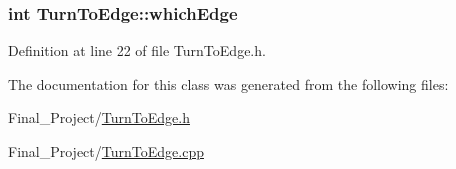\hypertarget{classTurnToEdge_a2a5053fc4cc07dd36874e327d4790a72}{
\subsubsection[{which\-Edge}]{\setlength{\rightskip}{0pt plus 5cm}int Turn\-To\-Edge\-::which\-Edge\hspace{0.3cm}{\ttfamily [private]}}}\label{classTurnToEdge_a2a5053fc4cc07dd36874e327d4790a72}


Definition at line 22 of file Turn\-To\-Edge.\-h.



The documentation for this class was generated from the following files\-:\begin{DoxyCompactItemize}
\item 
Final\-\_\-\-Project/\hyperlink{TurnToEdge_8h}{Turn\-To\-Edge.\-h}\item 
Final\-\_\-\-Project/\hyperlink{TurnToEdge_8cpp}{Turn\-To\-Edge.\-cpp}\end{DoxyCompactItemize}
